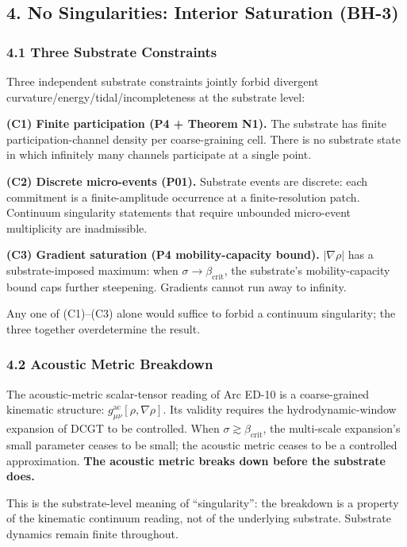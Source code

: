 \documentclass[
  11pt,
  a4paper,
]{article}
\begin{document}
\subsection{4. No Singularities: Interior Saturation
(BH-3)}\label{no-singularities-interior-saturation-bh-3}

\subsubsection{4.1 Three Substrate
Constraints}\label{three-substrate-constraints}

Three independent substrate constraints jointly forbid divergent
curvature/energy/tidal/incompleteness at the substrate level:

\textbf{(C1) Finite participation (P4 + Theorem N1).} The substrate has
finite participation-channel density per coarse-graining cell. There is
no substrate state in which infinitely many channels participate at a
single point.

\textbf{(C2) Discrete micro-events (P01).} Substrate events are
discrete: each commitment is a finite-amplitude occurrence at a
finite-resolution patch. Continuum singularity statements that require
unbounded micro-event multiplicity are inadmissible.

\textbf{(C3) Gradient saturation (P4 mobility-capacity bound).}
\(|\nabla\rho|\) has a substrate-imposed maximum: when
\(\sigma \to \beta_\mathrm{crit}\), the substrate's mobility-capacity
bound caps further steepening. Gradients cannot run away to infinity.

Any one of (C1)--(C3) alone would suffice to forbid a continuum
singularity; the three together overdetermine the result.

\subsubsection{4.2 Acoustic Metric
Breakdown}\label{acoustic-metric-breakdown}

The acoustic-metric scalar-tensor reading of Arc ED-10 is a
coarse-grained kinematic structure:
\(g_{\mu\nu}^\mathrm{ac}[\rho,\nabla\rho]\). Its validity requires the
hydrodynamic-window expansion of DCGT to be controlled. When
\(\sigma \gtrsim \beta_\mathrm{crit}\), the multi-scale expansion's
small parameter ceases to be small; the acoustic metric ceases to be a
controlled approximation. \textbf{The acoustic metric breaks down before
the substrate does.}

This is the substrate-level meaning of ``singularity'': the breakdown is
a property of the kinematic continuum reading, not of the underlying
substrate. Substrate dynamics remain finite throughout.
\end{document}
